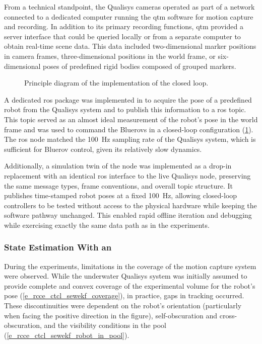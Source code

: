 From a technical standpoint, the Qualisys cameras operated as part of a network connected to a
dedicated computer running the \ac{qtm} software for motion capture and recording. In addition to
its primary recording functions, \ac{qtm} provided a server interface that could be queried locally
or from a separate computer to obtain real-time scene data. This data included two-dimensional
marker positions in camera frames, three-dimensional positions in the world frame, or
six-dimensional poses of predefined rigid bodies composed of grouped markers.

\begin{figure}
	\centering
	\caption{Principle diagram of the implementation of the closed loop.}
	\label{e_rcce_ctcl_rtfftqs_closed_loop_diagram}
\end{figure}

A dedicated \ac{ros} package was implemented in  to acquire the
pose of a predefined robot from the Qualisys system and to publish this information to a \ac{ros}
topic. This topic served as an almost ideal measurement of the robot's pose in the world frame and
was used to command the Bluerovs in a closed-loop configuration
(\cref{e_rcce_ctcl_rtfftqs_closed_loop_diagram}). The \ac{ros} node matched the \qty{100}{\Hz}
sampling rate of the Qualisys system, which is sufficient for Bluerov control, given its relatively
slow dynamics.

Additionally, a simulation twin of the node was implemented as a drop-in replacement with an
identical \ac{ros} interface to the live Qualisys node, preserving the same message types, frame
conventions, and overall topic structure. It publishes time-stamped robot poses at a fixed
\qty{100}{\Hz}, allowing closed-loop controllers to be tested without access to the physical
hardware while keeping the software pathway unchanged. This enabled rapid offline iteration and
debugging while exercising exactly the same data path as in the experiments.

\subsubsection{State Estimation With an }
\label{ex_rcce_ctcl_state_estimation_with_extended_kalman_filter}

During the experiments, limitations in the coverage of the motion capture system were observed.
While the underwater Qualisys system was initially assumed to provide complete and convex coverage
of the experimental volume for the robot's pose (\cref{e_rcce_ctcl_sewekf_coverage}), in practice,
gaps in tracking occurred. These discontinuities were dependent on the robot's orientation
(particularly when facing the positive  direction in the figure), self-obscuration and
cross-obscuration, and the visibility conditions in the pool
(\cref{e_rcce_ctcl_sewekf_robot_in_pool}).

